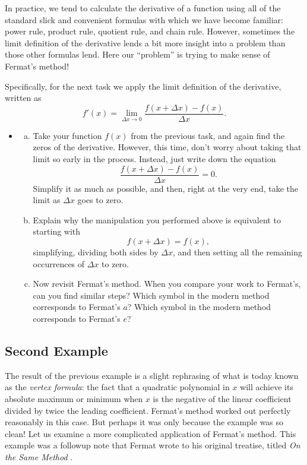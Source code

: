 \documentclass[11pt]{article}
\newcounter{tasknumb}
\newcommand{\tasknumb}[1]{\refstepcounter{tasknumb}\textmd{\textbf{$\fbox{$\fbox{Task \thetasknumb}$}$}}#1}
\newenvironment{task}[1][]%
 {\begin{itemize}
 \item[\tasknumb{#1}]  }
{
    \end{itemize}    }%
\begin{document}
In practice, we tend to calculate the derivative of a function using all of the standard slick and convenient formulas with which we have become familiar: power rule, product rule, quotient rule, and chain rule.  However, sometimes the limit definition of the derivative lends a bit more insight into a problem than those other formulas lend.  Here our ``problem'' is trying to make sense of Fermat's method!

Specifically, for the next task we apply the limit definition of the derivative, written as $$f'(x)=\lim_{\Delta x \to 0} \frac{f(x+\Delta x)-f(x)}{\Delta x}.$$

\begin{task}
\begin{enumerate}[(a)]\label{comparison}
    \item Take your function $f(x)$ from the previous task, and again find the zeros of the derivative.  However, this time, don't worry about taking that limit so early in the process.  Instead, just write down the equation $$\frac{f(x+\Delta x)-f(x)}{\Delta x}=0.$$ Simplify it as much as possible, and then, right at the very end, take the limit as $\Delta x$ goes to zero. 
    
    \item Explain why the manipulation you performed above is equivalent to starting with $$f(x+\Delta x)=f(x),$$ simplifying, dividing both sides by $\Delta x$, and then setting all the remaining occurrences of $\Delta x$ to zero.
    
    \item Now revisit Fermat's method.  When you compare your work to Fermat's, can you find similar steps?  Which symbol in the modern method corresponds to Fermat's $a$?  Which symbol in the modern method corresponds to Fermat's $e$?   
\end{enumerate}
\end{task}

\subsection{Second Example}\label{Second}
The result of the previous example is a slight rephrasing of what is today known as the \emph{vertex formula}: the fact that a quadratic polynomial in $x$ will achieve its absolute maximum or minimum when $x$ is the negative of the linear coefficient divided by twice the leading coefficient.  Fermat's method worked out perfectly reasonably in this case.  But perhaps it was only because the example was so clean!  Let us examine a more complicated application of Fermat's method.  This example was a followup note that Fermat wrote to his original treatise, titled \emph{On the Same Method} \citep[page 126]{Tannery}.
\end{document}
